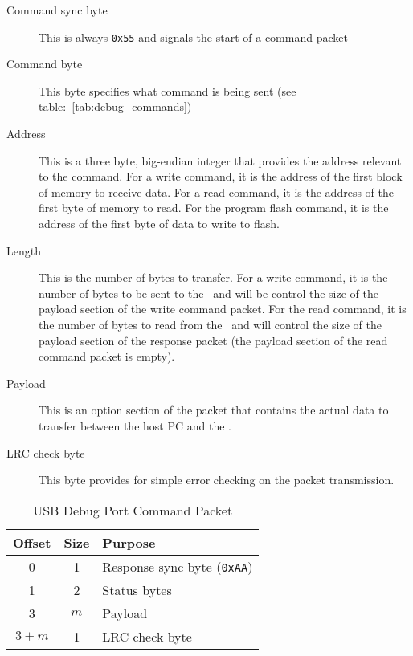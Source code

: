 \begin{description}
    \item[Command sync byte] This is always \verb+0x55+ and signals the start of a command packet

    \item[Command byte] This byte specifies what command is being sent (see table:~\ref{tab:debug_commands})

    \item[Address] This is a three byte, big-endian integer that provides the address relevant to the command. For a write command, it is the address of the first block of memory to receive data. For a read command, it is the address of the first byte of memory to read. For the program flash command, it is the address of the first byte of data to write to flash.

    \item[Length] This is the number of bytes to transfer. For a write command, it is the number of bytes to be sent to the \jr\ and will be control the size of the payload section of the write command packet. For the read command, it is the number of bytes to read from the \jr\ and will control the size of the payload section of the response packet (the payload section of the read command packet is empty).

    \item[Payload] This is an option section of the packet that contains the actual data to transfer between the host PC and the \jr.

    \item[LRC check byte] This byte provides for simple error checking on the packet transmission.
\end{description}

\begin{table}[h]
    \begin{center}
        \begin{tabular}{|c|c|l|} \hline
            Offset & Size & Purpose \\ \hline\hline
            0 & 1 & Response sync byte (\verb+0xAA+)\\ \hline
            1 & 2 & Status bytes \\ \hline
            3 & $m$ & Payload \\ \hline
            $3 + m$ & 1 & LRC check byte \\ \hline
        \end{tabular}
    \end{center}
    \caption{USB Debug Port Command Packet}
    \label{tab:debug_resp_packet}
\end{table}

